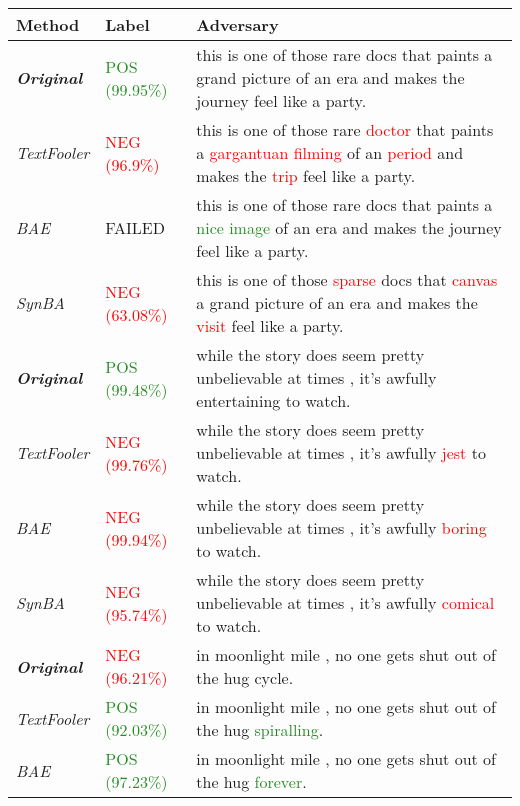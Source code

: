 \begin{table}[h]
    \footnotesize
    \centering
    \renewcommand{\arraystretch}{1.2}
    \begin{tabularx}{\textwidth}{|l||l|X|}
      \hline
      \textbf{Method} & \textbf{Label} & \textbf{Adversary} \\
      \hline \hline
      \textbf{\emph{Original}} & \textcolor{ForestGreen}{POS (99.95\%)} & this is one of those rare docs that paints a grand picture of an era and makes the journey feel like a party. \\
      \emph{TextFooler} & \textcolor{red}{NEG (96.9\%)} & this is one of those rare \textcolor{red}{doctor} that paints a \textcolor{red}{gargantuan filming} of an \textcolor{red}{period} and makes the \textcolor{red}{trip} feel like a party.\\
      \emph{BAE} & FAILED & this is one of those rare docs that paints a \textcolor{ForestGreen}{nice image} of an era and makes the journey feel like a party.      \\
      \emph{SynBA} & \textcolor{red}{NEG (63.08\%)} & this is one of those \textcolor{red}{sparse} docs that \textcolor{red}{canvas} a grand picture of an era and makes the \textcolor{red}{visit} feel like a party.\\
      \hline
      \textbf{\emph{Original}} & \textcolor{ForestGreen}{POS (99.48\%)} & while the story does seem pretty unbelievable at times , it's awfully entertaining to watch. \\
      \emph{TextFooler} & \textcolor{red}{NEG (99.76\%)} & while the story does seem pretty unbelievable at times , it's awfully \textcolor{red}{jest} to watch.\\
      \emph{BAE} & \textcolor{red}{NEG (99.94\%)} & while the story does seem pretty unbelievable at times , it's awfully \textcolor{red}{boring} to watch.\\
      \emph{SynBA} & \textcolor{red}{NEG (95.74\%)} & while the story does seem pretty unbelievable at times , it's awfully \textcolor{red}{comical} to watch.\\
      \hline
      \textbf{\emph{Original}} & \textcolor{red}{NEG (96.21\%)} & in moonlight mile , no one gets shut out of the hug cycle. \\
      \emph{TextFooler} & \textcolor{ForestGreen}{POS (92.03\%)} & in moonlight mile , no one gets shut out of the hug \textcolor{ForestGreen}{spiralling}.\\
      \emph{BAE} & \textcolor{ForestGreen}{POS (97.23\%)} & in moonlight mile , no one gets shut out of the hug \textcolor{ForestGreen}{forever}.\\

\end{tabularx}
\end{table}
